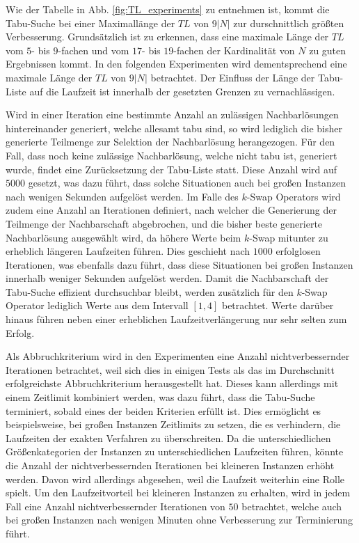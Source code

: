 \vfill
\pagebreak

Wie der Tabelle in Abb. \ref{fig:TL_experiments} zu entnehmen ist, kommt die Tabu-Suche bei einer Maximallänge der $TL$
von $9|N|$ zur durschnittlich größten Verbesserung. Grundsätzlich ist zu erkennen, dass eine maximale Länge der $TL$
vom $5$- bis $9$-fachen und vom $17$- bis $19$-fachen der Kardinalität von $N$ zu guten Ergebnissen kommt.
In den folgenden Experimenten wird dementsprechend eine maximale Länge der $TL$ von $9|N|$ betrachtet. Der Einfluss der Länge der Tabu-Liste auf die Laufzeit ist innerhalb der gesetzten Grenzen zu vernachlässigen.

Wird in einer Iteration eine bestimmte Anzahl an zulässigen Nachbarlösungen hintereinander generiert, welche allesamt
tabu sind, so wird lediglich die bisher generierte Teilmenge zur Selektion der Nachbarlösung herangezogen.
Für den Fall, dass noch keine zulässige Nachbarlösung, welche nicht tabu ist, generiert wurde, findet eine
Zurücksetzung der Tabu-Liste statt. Diese Anzahl wird auf $5000$ gesetzt, was dazu führt, dass solche
Situationen auch bei großen Instanzen nach wenigen Sekunden aufgelöst werden.
Im Falle des $k$-Swap Operators wird zudem eine Anzahl an Iterationen definiert, nach welcher die Generierung der Teilmenge der Nachbarschaft abgebrochen, und die bisher beste generierte Nachbarlösung ausgewählt wird,
da höhere Werte beim $k$-Swap mitunter zu erheblich längeren Laufzeiten führen. Dies geschieht nach $1000$
erfolglosen Iterationen, was ebenfalls dazu führt, dass diese Situationen bei großen Instanzen
innerhalb weniger Sekunden aufgelöst werden.
Damit die Nachbarschaft der Tabu-Suche effizient durchsuchbar bleibt, werden zusätzlich für den $k$-Swap Operator lediglich Werte aus dem Intervall $[1, 4]$ betrachtet. Werte darüber hinaus führen
neben einer erheblichen Laufzeitverlängerung nur sehr selten zum Erfolg.

Als Abbruchkriterium wird in den Experimenten eine Anzahl nichtverbessernder Iterationen betrachtet,
weil sich dies in einigen Tests als das im Durchschnitt erfolgreichste Abbruchkriterium herausgestellt hat.
Dieses kann allerdings mit einem Zeitlimit kombiniert werden, was dazu führt, dass die Tabu-Suche terminiert,
sobald eines der beiden Kriterien erfüllt ist. Dies ermöglicht es beispielsweise, bei großen Instanzen
Zeitlimits zu setzen, die es verhindern, die Laufzeiten der exakten Verfahren zu überschreiten.
Da die unterschiedlichen Größenkategorien der Instanzen zu unterschiedlichen Laufzeiten
führen, könnte die Anzahl der nichtverbessernden Iterationen bei kleineren Instanzen erhöht werden.
Davon wird allerdings abgesehen, weil die Laufzeit weiterhin eine Rolle spielt. Um den Laufzeitvorteil bei
kleineren Instanzen zu erhalten, wird in jedem Fall eine Anzahl nichtverbessernder Iterationen von $50$ betrachtet,
welche auch bei großen Instanzen nach wenigen Minuten ohne Verbesserung zur Terminierung führt.

